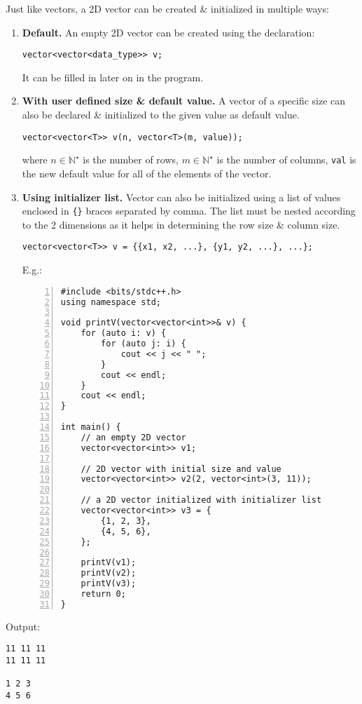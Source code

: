 \documentclass{article}
\begin{document}
Just like vectors, a 2D vector can be created \& initialized in multiple ways:
\begin{enumerate}
	\item {\bf Default.} An empty 2D vector can be created using the declaration:
	\begin{verbatim}
vector<vector<data_type>> v;
	\end{verbatim}
	It can be filled in later on in the program.
	\item {\bf With user defined size \& default value.} A vector of a specific size can also be declared \& initialized to the given value as default value.
	\begin{verbatim}
vector<vector<T>> v(n, vector<T>(m, value));
	\end{verbatim}
	where $n\in\mathbb{N}^\star$ is the number of rows, $m\in\mathbb{N}^\star$ is the number of columns, {\tt val} is the new default value for all of the elements of the vector.
	\item {\bf Using initializer list.} Vector can also be initialized using a list of values enclosed in {\tt\{\}} braces separated by comma. The list must be nested according to the 2 dimensions as it helps in determining the row size \& column size.
	\begin{verbatim}
vector<vector<T>> v = {{x1, x2, ...}, {y1, y2, ...}, ...};
	\end{verbatim}
	E.g.:
	\begin{Verbatim}[numbers=left,xleftmargin=5mm]
#include <bits/stdc++.h>
using namespace std;

void printV(vector<vector<int>>& v) {
    for (auto i: v) {
        for (auto j: i) {
            cout << j << " ";
        }
        cout << endl;
    }
    cout << endl;
}

int main() {
    // an empty 2D vector
    vector<vector<int>> v1;
	
    // 2D vector with initial size and value
	vector<vector<int>> v2(2, vector<int>(3, 11));
	
    // a 2D vector initialized with initializer list
    vector<vector<int>> v3 = {
        {1, 2, 3},
        {4, 5, 6},
    };
	
    printV(v1);
    printV(v2);
    printV(v3);
    return 0;
}
	\end{Verbatim}
\end{enumerate}
Output:
\begin{verbatim}
11 11 11
11 11 11

1 2 3
4 5 6
\end{verbatim}
\end{document}
